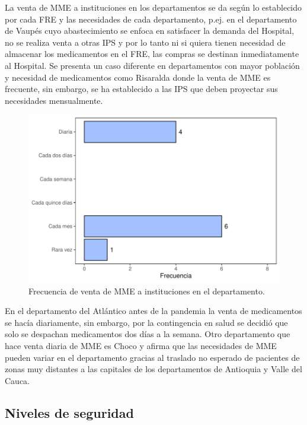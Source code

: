 \documentclass[
]{book}
\begin{document}
La venta de MME a instituciones en los departamentos se da según lo establecido por cada FRE y las necesidades de cada departamento, p.ej. en el departamento de Vaupés cuyo abastecimiento se enfoca en satisfacer la demanda del Hospital, no se realiza venta a otras IPS y por lo tanto ni si quiera tienen necesidad de almacenar los medicamentos en el FRE, las compras se destinan inmediatamente al Hospital. Se presenta un caso diferente en departamentos con mayor población y necesidad de medicamentos como Risaralda donde la venta de MME es frecuente, sin embargo, se ha establecido a las IPS que deben proyectar sus necesidades mensualmente.

\begin{figure}[t]

{\centering \includegraphics[width=0.85\linewidth]{InformeFinal_files/figure-latex/FrecVentaInstituciones-1} 

}

\caption{Frecuencia de venta de MME a instituciones en el departamento.}\label{fig:FrecVentaInstituciones}
\end{figure}

En el departamento del Atlántico antes de la pandemia la venta de medicamentos se hacía diariamente, sin embargo, por la contingencia en salud se decidió que solo se despachan medicamentos dos días a la semana. Otro departamento que hace venta diaria de MME es Choco y afirma que las necesidades de MME pueden variar en el departamento gracias al traslado no esperado de pacientes de zonas muy distantes a las capitales de los departamentos de Antioquia y Valle del Cauca.

\hypertarget{niveles-de-seguridad}{%
\subsection{Niveles de seguridad}\label{niveles-de-seguridad}}
\end{document}

